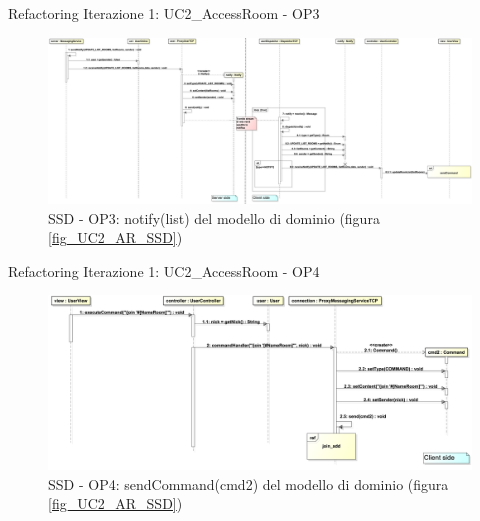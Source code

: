 \begin{frame} {Refactoring Iterazione 1: UC2\_AccessRoom - OP3}
   \begin{figure}
     \includegraphics[scale=0.085]{image_astah/Iteration_1_DesignModel_Refactored/UC2_AccessRoom_SSD_3_notify.png}{\centering}
     \caption{SSD - OP3: notify(list) del modello di dominio (figura \ref{fig_UC2_AR_SSD})}
     \label{fig_UC2_SSDR_AC_3} 
   \end{figure}
\end{frame}

\begin{frame} {Refactoring Iterazione 1: UC2\_AccessRoom - OP4}
   \begin{figure}
     \includegraphics[scale=0.158]{image_astah/Iteration_1_DesignModel_Refactored/UC2_AccessRoom_SSD_4_sendCommand.png}{\centering}
     \caption{SSD - OP4: sendCommand(cmd2) del modello di dominio (figura \ref{fig_UC2_AR_SSD}) }
     \label{fig_UC2_SSDR_AC_4} 
   \end{figure}
\end{frame}

